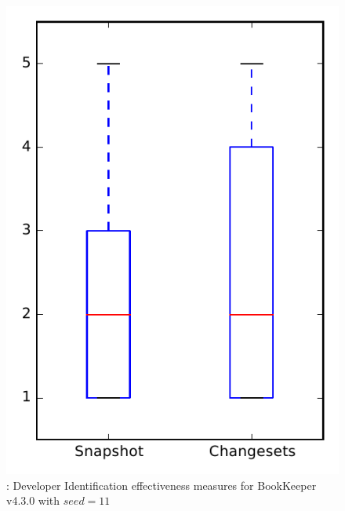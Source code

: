 
\begin{figure}
\centering
\includegraphics[height=0.4\textheight]{figures/dit_seed/rq1_bookkeeper_11}
\caption{\rtwo: Developer Identification effectiveness measures for BookKeeper v4.3.0 with $seed=11$}
\label{fig:dit_seed:rq1:bookkeeper}
\end{figure}
